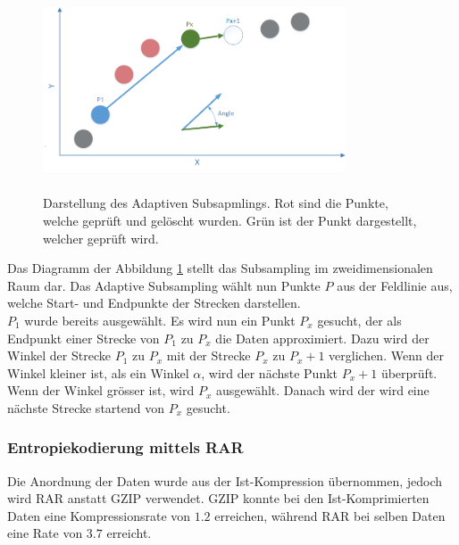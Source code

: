 \begin{figure}[!htbp]
	\center
	\includegraphics[width=0.8\textwidth,height=6cm,keepaspectratio]{./pictures/konzept/solution0/anglesubsampling.png}
	\caption{Darstellung des Adaptiven Subsapmlings. Rot sind die Punkte, welche geprüft und gelöscht wurden. Grün ist der Punkt dargestellt, welcher geprüft wird.}
	\label{konzept:loesung0:angle}
\end{figure}
Das Diagramm der Abbildung \ref{konzept:loesung0:angle} stellt das Subsampling im zweidimensionalen Raum dar. Das Adaptive Subsampling wählt nun Punkte $P$ aus der Feldlinie aus, welche Start- und Endpunkte der Strecken darstellen.\\
$P_1$ wurde bereits ausgewählt. Es wird nun ein Punkt $P_x$ gesucht, der als Endpunkt einer Strecke von $P_1$ zu $P_x$ die Daten approximiert. Dazu wird der Winkel der Strecke $P_1$ zu $P_x$ mit der Strecke $P_x$ zu $P_x+1$ verglichen. Wenn der Winkel kleiner ist, als ein Winkel $\alpha$, wird der nächste Punkt $P_x+1$ überprüft. Wenn der Winkel grösser ist, wird $P_x$ ausgewählt. Danach wird der wird eine nächste Strecke startend von $P_x$ gesucht.

\subsubsection{Entropiekodierung mittels RAR} \label{konzept:loesung0:kodierung}
Die Anordnung der Daten wurde aus der Ist-Kompression übernommen, jedoch wird RAR anstatt GZIP verwendet. GZIP konnte bei den Ist-Komprimierten Daten eine Kompressionsrate von $1.2$ erreichen, während RAR bei selben Daten eine Rate von $3.7$ erreicht.
\pagebreak

